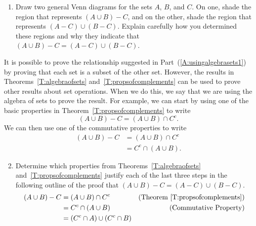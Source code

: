 \begin{prog} \label{prog:usingalgebrasets} \hfill
\begin{enumerate}
  \item Draw two general Venn diagrams for the sets  $A$, $B$, and  $C$.  On one, shade the region that represents  $\left( {A \cup B} \right) - C$, and on the other, shade the region that represents  $\left( {A - C} \right) \cup \left( {B - C} \right)$.  Explain carefully how you determined these regions and why they indicate that $\left( {A \cup B} \right) - C = \left( {A - C} \right) \cup \left( {B - C} \right)$.  \label{A:usingalgebrasets1}
\end{enumerate}
It is possible to prove the relationship suggested in Part~(\ref{A:usingalgebrasets1}) by proving that each set is a subset of the other set.  However, the results in Theorems~\ref{T:algebraofsets} and~\ref{T:propsofcomplements} can be used to prove other results about set operations.  When we do this, we say that we are using the algebra of sets to prove the result.  For example, we can start by using one of the basic properties in Theorem~\ref{T:propsofcomplements} to write
%
\[
\left( {A \cup B} \right) - C = \left( {A \cup B} \right) \cap C^c.
\]
We can then use one of the commutative properties to write
\begin{align*}
\left( {A \cup B} \right) - C &= \left( {A \cup B} \right) \cap C^c \\
                              &= C^c  \cap \left( {A \cup B} \right).
\end{align*}
\begin{enumerate} \setcounter{enumi}{1}
  \item Determine which properties from Theorems~\ref{T:algebraofsets} and~\ref{T:propsofcomplements} justify each of the last three steps in the following outline of the proof that $\left( {A \cup B} \right) - C = \left( {A - C} \right) \cup \left( {B - C} \right)$.
\begin{align*}
\left( {A \cup B} \right) - C &= \left( {A \cup B} \right) \cap C^c & \text{(Theorem \ref{T:propsofcomplements})} \\
                              &= C^c  \cap \left( {A \cup B} \right) &\text{(Commutative Property)} \\
                              &= \left( C^c \cap A \right) \cup \left( C^c \cap B \right) \\

\end{align*}
\end{enumerate}
\end{prog}
